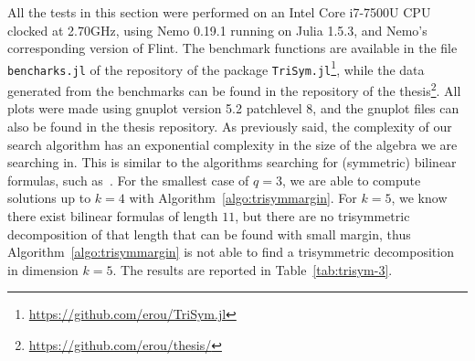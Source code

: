 All the tests in this section were performed on an Intel Core i7-7500U
CPU clocked at 2.70GHz, using Nemo 0.19.1 running on Julia 1.5.3, and Nemo’s
corresponding version of Flint. The benchmark functions are available in the
file \texttt{bencharks.jl} of the repository of the package
\texttt{TriSym.jl}\footnote{\url{https://github.com/erou/TriSym.jl}}, while the
data generated from the benchmarks can be found in the repository of the
thesis\footnote{\url{https://github.com/erou/thesis/}}. All plots were made
using gnuplot version 5.2 patchlevel 8, and the gnuplot files can also be found
in the thesis repository. As previously said, the complexity of our search
algorithm has an exponential complexity in the size of the algebra we are
searching in. This is similar to the algorithms searching for (symmetric)
bilinear formulas, such as~\cite{Covanov19, BDEZ12}. For the smallest case of
$q=3$, we are able to compute solutions up to $k=4$ with
Algorithm~\ref{algo:trisymmargin}. For $k=5$, we know there exist bilinear
formulas of length $11$, but there are no trisymmetric decomposition of that
length that can be found with small margin, thus
Algorithm~\ref{algo:trisymmargin} is not able to find a trisymmetric
decomposition in dimension $k=5$. The results are reported in
Table~\ref{tab:trisym-3}.
